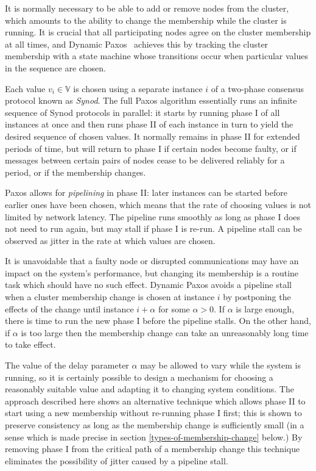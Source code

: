 \documentclass[journal]{IEEEtran}
\begin{document}
It is normally necessary to be able to add or remove nodes from the cluster,
which amounts to the ability to change the membership while the cluster is
running. It is crucial that all participating nodes agree on the cluster
membership at all times, and Dynamic Paxos~\cite{cheap-paxos} achieves this by
tracking the cluster membership with a state machine whose transitions occur
when particular values in the sequence are chosen.

Each value $v_i \in \mathbb V$ is chosen using a separate instance $i$ of a
two-phase consensus protocol known as \textit{Synod}. The full Paxos algorithm
essentially runs an infinite sequence of Synod protocols in parallel: it starts
by running phase I of all instances at once and then runs phase II of each
instance in turn to yield the desired sequence of chosen values. It normally
remains in phase II for extended periods of time, but will return to phase I if
certain nodes become faulty, or if messages between certain pairs of nodes
cease to be delivered reliably for a period, or if the membership changes.

Paxos allows for \textit{pipelining} in phase II: later instances can be
started before earlier ones have been chosen, which means that the rate of
choosing values is not limited by network latency. The pipeline runs smoothly
as long as phase I does not need to run again, but may stall if phase I is
re-run. A pipeline stall can be observed as jitter in the rate at which values
are chosen.

It is unavoidable that a faulty node or disrupted communications may have an
impact on the system's performance, but changing its membership is a routine
task which should have no such effect. Dynamic Paxos avoids a pipeline stall
when a cluster membership change is chosen at instance $i$ by postponing the
effects of the change until instance $i + \alpha$ for some $\alpha > 0$. If
$\alpha$ is large enough, there is time to run the new phase I before the
pipeline stalls.  On the other hand, if $\alpha$ is too large then the
membership change can take an unreasonably long time to take effect.

The value of the delay parameter $\alpha$ may be allowed to vary while the
system is running, so it is certainly possible to design a mechanism for
choosing a reasonably suitable value and adapting it to changing system
conditions. The approach described here shows an alternative technique which
allows phase II to start using a new membership without re-running phase I
first; this is shown to preserve consistency as long as the membership change
is sufficiently small (in a sense which is made precise in section
\ref{types-of-membership-change} below.) By removing phase I from the critical
path of a membership change this technique eliminates the possibility of jitter
caused by a pipeline stall.
\end{document}

